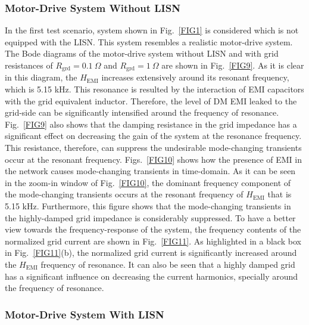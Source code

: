 \documentclass[journal,a4paper,10pt,twoside]{IEEEtran} %
\begin{document}
    \subsubsection{Motor-Drive System Without LISN}
    In the first test scenario, system shown in Fig.~\ref{FIG1} is considered which is not equipped with the LISN. This system resembles a realistic motor-drive system. The Bode diagrams of the motor-drive system without LISN and with grid resistances of $R_\mathrm{grd}=0.1~\Omega$ and $R_\mathrm{grd}=1~\Omega$ are shown in Fig.~\ref{FIG9}. As it is clear in this diagram, the $H_\mathrm{EMI}$ increases extensively around its resonant frequency, {\color{red} which is 5.15 kHz}. This resonance is resulted by the interaction of EMI capacitors with the grid equivalent inductor. Therefore, the level of DM EMI leaked to the grid-side can be significantly intensified around the frequency of resonance. Fig.~\ref{FIG9} also shows that the damping resistance in the grid impedance has a significant effect on decreasing the gain of the system at the resonance frequency. This resistance, therefore, can suppress the undesirable mode-changing transients occur at the resonant frequency. Figs.~\ref{FIG10} shows how the presence of EMI in the network causes mode-changing transients in time-domain. As it can be seen in the zoom-in window of Fig.~\ref{FIG10}, the dominant frequency component of the mode-changing transients occurs at the resonant frequency of $H_\mathrm{EMI}$ {\color{red} that is 5.15 kHz}. Furthermore, this figure shows that the mode-changing transients in the highly-damped grid impedance is considerably suppressed. To have a better view towards the frequency-response of the system, the frequency contents of the normalized grid current are shown in Fig.~\ref{FIG11}. As highlighted in a black box in Fig.~\ref{FIG11}(b), the normalized grid current is significantly increased around the $H_\mathrm{EMI}$ frequency of resonance. It can also be seen that a highly damped grid has a significant influence on decreasing the current harmonics, specially around the frequency of resonance. 
    
    \subsubsection{Motor-Drive System With LISN}
    
\end{document}
